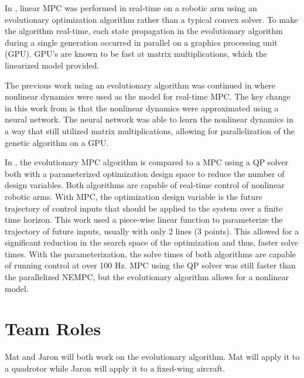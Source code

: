 \documentclass[letterpaper, 10 pt, conference]{ieeeconf}  %
\begin{document}
In \cite{hyatt2017real}, linear MPC was performed in real-time on a robotic arm using an evolutionary optimization algorithm rather than a typical convex solver. To make the algorithm real-time, each state propagation in the evolutionary algorithm during a single generation occurred in parallel on a graphics processing unit (GPU). GPU's are known to be fast at matrix multiplications, which the linearized model provided.

The previous work using an evolutionary algorithm was continued in \cite{hyatt2019real} where nonlinear dynamics were used as the model for real-time MPC. The key change in this work from \cite{hyatt2017real} is that the nonlinear dynamics were approximated using a neural network. The neural network was able to learn the nonlinear dynamics in a way that still utilized matrix multiplications, allowing for parallelization of the genetic algorithm on a GPU.

In \cite{hyatt2020parameterized}, the evolutionary MPC algorithm is compared to a MPC using a QP solver both with a parameterized optimization design space to reduce the number of design variables. Both algorithms are capable of real-time control of nonlinear robotic arms. With MPC, the optimization design variable is the future trajectory of control inputs that should be applied to the system over a finite time horizon. This work used a piece-wise linear function to parameterize the trajectory of future inputs, usually with only 2 lines (3 points). This allowed for a significant reduction in the search space of the optimization and thus, faster solve times. With the parameterization, the solve times of both algorithms are capable of running control at over 100 Hz. MPC using the QP solver was still faster than the parallelized NEMPC, but the evolutionary algorithm allows for a nonlinear model.

\section{Team Roles}

Mat and Jaron will both work on the evolutionary algorithm. Mat will apply it to a quadrotor while Jaron will apply it to a fixed-wing aircraft. 



\end{document}
